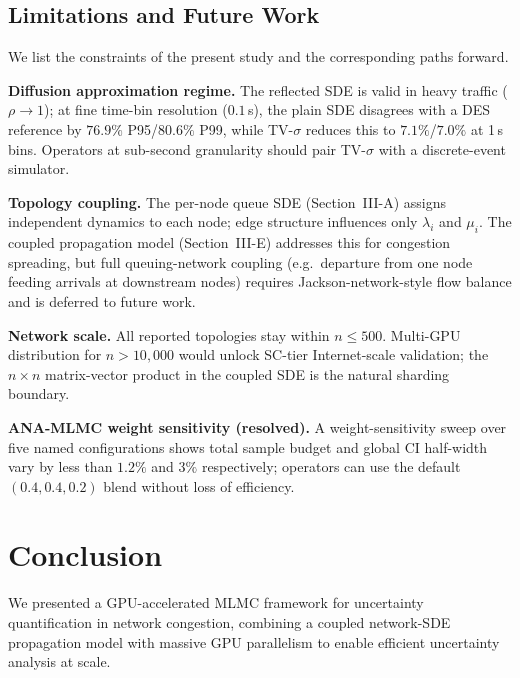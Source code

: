\documentclass[pdflatex,sn-mathphys-num]{sn-jnl}
\theoremstyle{thmstyleone}%
\theoremstyle{thmstyletwo}%
\theoremstyle{thmstylethree}%
\begin{document}
\subsection{Limitations and Future Work}
\label{subsec:limitations}

We list the constraints of the present study and the corresponding paths forward.

\par\textbf{Diffusion approximation regime.} The reflected SDE is valid in heavy traffic ($\rho\!\to\!1$); at fine time-bin resolution ($0.1$\,s), the plain SDE disagrees with a DES reference by $76.9\%$ P95/$80.6\%$ P99, while TV-$\sigma$ reduces this to $7.1\%$/$7.0\%$ at 1\,s bins. Operators at sub-second granularity should pair TV-$\sigma$ with a discrete-event simulator.

\par\textbf{Topology coupling.} The per-node queue SDE (Section~III-A) assigns independent
dynamics to each node; edge structure influences only $\lambda_i$ and $\mu_i$. The coupled
propagation model (Section~III-E) addresses this for congestion spreading, but full
queuing-network coupling (e.g.\ departure from one node feeding arrivals at downstream nodes)
requires Jackson-network-style flow balance and is deferred to future work.

\par\textbf{Network scale.} All reported topologies stay within $n\le500$. Multi-GPU distribution
for $n>10{,}000$ would unlock SC-tier Internet-scale validation; the $n\times n$ matrix-vector
product in the coupled SDE is the natural sharding boundary.

\par\textbf{ANA-MLMC weight sensitivity (resolved).} A weight-sensitivity sweep over five named configurations shows total sample budget and global CI half-width vary by less than $1.2\%$ and $3\%$ respectively; operators can use the default $(0.4,0.4,0.2)$ blend without loss of efficiency.


\section{Conclusion}

We presented a GPU-accelerated MLMC framework for uncertainty quantification in network
congestion, combining a coupled network-SDE propagation model with massive GPU parallelism to
enable efficient uncertainty analysis at scale.
\end{document}
